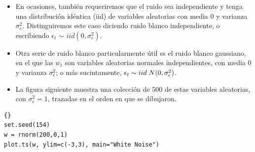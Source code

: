 \begin{itemize}
	\item En ocasiones, tambi\'en requeriremos que el ruido sea independiente y tenga una distribuci\'on id\'entica (iid) de variables aleatorias con media 0 y varianza $\sigma^2_\epsilon$. Distinguiremos este caso diciendo ruido blanco independiente, o escribiendo $\epsilon_t$ $\sim$ $iid (0, \sigma^2_\epsilon)$. 
	\item Otra serie de ruido blanco particularmente \'util es el ruido blanco gaussiano, en el que las $w_t$ son variables aleatorias normales independientes, con media $0$ y varianza $\sigma^2_\epsilon$; o m\'as sucintamente, $\epsilon_t \sim iid \hspace{0.1cm}N(0, \sigma^2_\epsilon)$. 
	\item La figura siguiente muestra una colecci\'on de 500 de estas variables aleatorias, con $\sigma^2_\epsilon=1$, trazadas en el orden en que se dibujaron.
\end{itemize}

%
%
\begin{lstlisting}[title={‘Código R para generar Ruido blanco’},basicstyle=\ttfamily]{}
set.seed(154)
w = rnorm(200,0,1)
plot.ts(w, ylim=c(-3,3), main="White Noise")
\end{lstlisting}\label{codigoRuidoBlanco}

